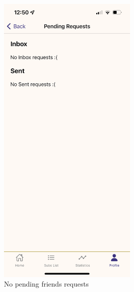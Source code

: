 \documentclass[11pt]{article}
\begin{document}
\begin{figure}[h!]
\begin{minipage}[c]{0.45\textwidth}
        \includegraphics[width=0.6\textwidth, clip]{../../assets/smartphone/pending.PNG}
        \caption{No pending friends requests}
        \label{fig:pending}
    \end{minipage}
\end{figure}
\end{document}
